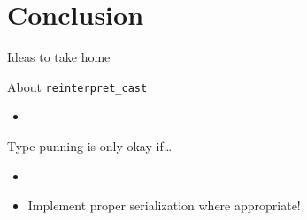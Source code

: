 \section{Conclusion}

\begin{frame}{Ideas to take home}
  \begin{block}{About \texttt{reinterpret\_cast}}
    \begin{itemize}
    \item
    \end{itemize}
  \end{block}

  \begin{block}{Type punning is only okay if\ldots}
    \begin{itemize}
    \item
    \end{itemize}
  \end{block}

  \begin{itemize}
  \item Implement proper serialization where appropriate!
  \end{itemize}

\end{frame}
